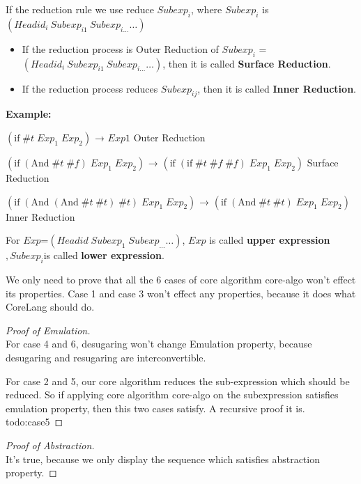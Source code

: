 If the reduction rule we use reduce $Subexp_{i}$, where $Subexp_{i}$ is $(Headid_{i}~Subexp_{i1}~Subexp_{i\ldots} \ldots)$
\begin{itemize}
	\item If the reduction process is Outer Reduction of $Subexp_{i}$ = $(Headid_{i}~Subexp_{i1}~Subexp_{i\ldots} \ldots)$, then it is called {\bfseries Surface Reduction}.
	\item If the reduction process reduces $Subexp_{ij}$, then it is called {\bfseries Inner Reduction}.
\end{itemize}

{\bfseries Example:}

$(\mbox{if}\; \#t\; Exp_{1}\; Exp_{2})$ → $Exp1$ \hfill Outer Reduction

$(\mbox{if}\; (\mbox{And}\; \#t\; \#f)\; Exp_{1}\; Exp_{2})$ → $(\mbox{if}\; (\mbox{if}\; \#t\; \#f\; \#f)\; Exp_{1}\; Exp_{2})$ \hfill Surface Reduction

$(\mbox{if}\; (\mbox{And}\; (\mbox{And}\; \#t\; \#t)\; \#t) \; Exp_{1}\; Exp_{2})$ → $(\mbox{if}\; (\mbox{And}\; \#t\; \#t)\; Exp_{1}\; Exp_{2})$ \hfill Inner Reduction

\begin{Def}
For $Exp$=$(Headid\;Subexp_{1}\;Subexp_{\ldots} \ldots)$, $Exp$ is called {\bfseries upper expression}$,Subexp_{i}$is called {\bfseries lower expression}.
\end{Def}

We only need to prove that all the 6 cases of core algorithm core-algo won't effect its properties. Case 1 and case 3 won't effect any properties, because it does what CoreLang should do.

\begin{proof}[Proof of Emulation]
\hfill\\
For case 4 and 6, desugaring won't change Emulation property, because desugaring and resugaring are interconvertible.

For case 2 and 5, our core algorithm reduces the sub-expression which should be reduced. So if applying core algorithm core-algo on the subexpression satisfies emulation property, then this two cases satisfy. A recursive proof it is.
todo:case5
\end{proof}

\begin{proof}[Proof of Abstraction]
\hfill\\
It's true, because we only display the sequence which satisfies abstraction property.
\end{proof}

